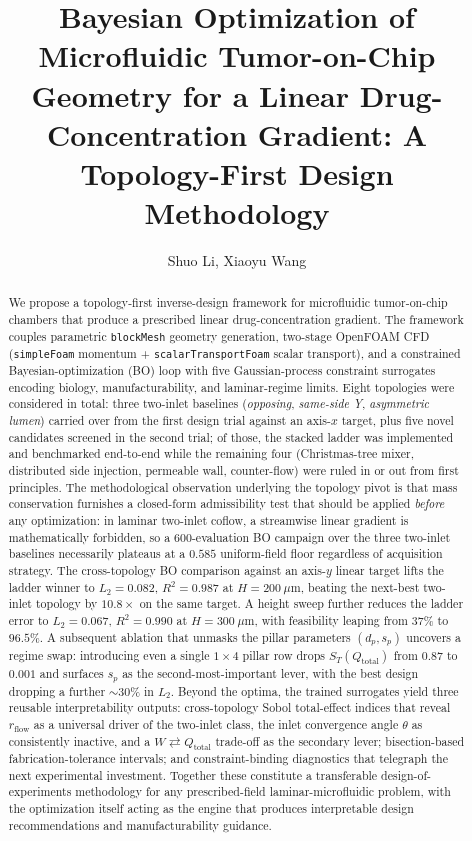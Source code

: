 \documentclass[12pt]{article}
\title{Bayesian Optimization of Microfluidic Tumor-on-Chip Geometry for a Linear Drug-Concentration Gradient: A Topology-First Design Methodology}
\author{Shuo Li, Xiaoyu Wang}
\begin{document}
\maketitle

\begin{abstract}
We propose a topology-first inverse-design framework for microfluidic tumor-on-chip chambers that produce a prescribed linear drug-concentration gradient. The framework couples parametric \texttt{blockMesh} geometry generation, two-stage OpenFOAM CFD (\texttt{simpleFoam} momentum + \texttt{scalarTransportFoam} scalar transport), and a constrained Bayesian-optimization (BO) loop with five Gaussian-process constraint surrogates encoding biology, manufacturability, and laminar-regime limits. Eight topologies were considered in total: three two-inlet baselines (\emph{opposing}, \emph{same-side Y}, \emph{asymmetric lumen}) carried over from the first design trial against an axis-$x$ target, plus five novel candidates screened in the second trial; of those, the stacked ladder was implemented and benchmarked end-to-end while the remaining four (Christmas-tree mixer, distributed side injection, permeable wall, counter-flow) were ruled in or out from first principles. The methodological observation underlying the topology pivot is that mass conservation furnishes a closed-form admissibility test that should be applied \emph{before} any optimization: in laminar two-inlet coflow, a streamwise linear gradient is mathematically forbidden, so a $600$-evaluation BO campaign over the three two-inlet baselines necessarily plateaus at a $0.585$ uniform-field floor regardless of acquisition strategy. The cross-topology BO comparison against an axis-$y$ linear target lifts the ladder winner to $L_2 = 0.082$, $R^2 = 0.987$ at $H = 200~\mu$m, beating the next-best two-inlet topology by $10.8\times$ on the same target. A height sweep further reduces the ladder error to $L_2 = 0.067$, $R^2 = 0.990$ at $H = 300~\mu$m, with feasibility leaping from $37\%$ to $96.5\%$. A subsequent ablation that unmasks the pillar parameters $(d_p, s_p)$ uncovers a regime swap: introducing even a single $1\!\times\!4$ pillar row drops $S_T(Q_{\text{total}})$ from $0.87$ to $0.001$ and surfaces $s_p$ as the second-most-important lever, with the best design dropping a further $\sim 30\%$ in $L_2$. Beyond the optima, the trained surrogates yield three reusable interpretability outputs: cross-topology Sobol total-effect indices that reveal $r_{\text{flow}}$ as a universal driver of the two-inlet class, the inlet convergence angle $\theta$ as consistently inactive, and a $W \rightleftarrows Q_{\text{total}}$ trade-off as the secondary lever; bisection-based fabrication-tolerance intervals; and constraint-binding diagnostics that telegraph the next experimental investment. Together these constitute a transferable design-of-experiments methodology for any prescribed-field laminar-microfluidic problem, with the optimization itself acting as the engine that produces interpretable design recommendations and manufacturability guidance.
\end{abstract}
\end{document}

